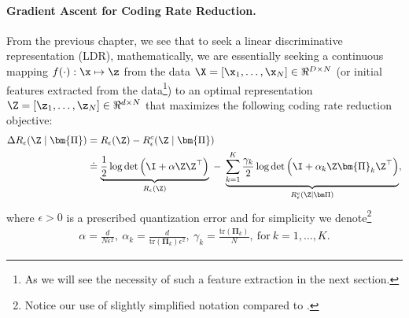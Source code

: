 \documentclass[../../book-main.tex]{subfiles}
\begin{document}
\paragraph{Gradient Ascent for Coding Rate Reduction.} From the previous chapter, we see that to seek a linear discriminative representation (LDR), mathematically, we are essentially seeking a continuous mapping $f(\cdot): \x \mapsto \z$ from the data $\X = [\x_1, \ldots, \x_N] \in \Re^{D \times N}$ (or initial features extracted from the data\footnote{As we will see the necessity of such a feature extraction in the next section.}) to an optimal representation $\Z = [\z_1, \ldots, \z_N] \in \Re^{d \times N}$ that maximizes the following coding rate reduction objective:
\begin{equation}\label{eq:mcr-formulation}
\begin{split}
\Delta R_{\epsilon}(\Z \mid \bm{\Pi}) &= R_\epsilon(\Z) - R_{\epsilon}^c(\Z \mid  \bm{\Pi})\\
&\doteq \underbrace{\frac{1}{2}\log\det \Big(\I + {\alpha} \Z \Z^{\top} \Big)}_{R_{\epsilon}(\Z)} \;-\; \underbrace{\sum_{k=1}^{K}\frac{\gamma_{k}}{2} \log\det\Big(\I + {\alpha_{k}} \Z \bm{\Pi}_{k} \Z^{\top} \Big)}_{R_{\epsilon}^c(\Z \mid \bm \Pi)},
\end{split}
\end{equation}
where $\epsilon > 0$ is a prescribed quantization error and for simplicity we denote\footnote{Notice our use of slightly simplified notation compared to .}
\begin{align*}
    \alpha=\frac{d}{N\epsilon^2},\ \alpha_{k}=\frac{d}{\mathrm{tr}(\bm{\Pi}_{k})\epsilon^2},\ \gamma_{k}=\frac{\mathrm{tr}(\bm{\Pi}_{k})}{N},\ \text{for}\ k = 1,\ldots, K.
\end{align*}
\end{document}
